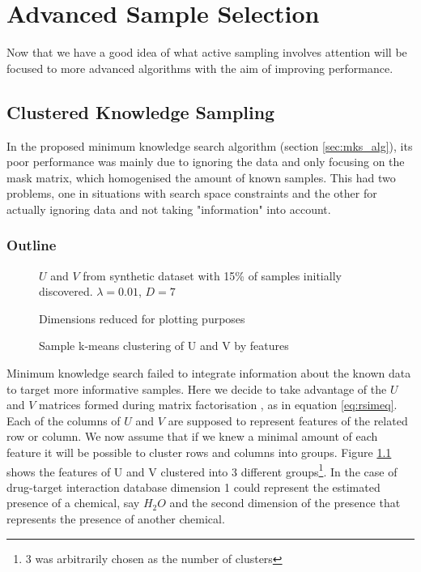 \chapter{Advanced Sample Selection}
\ifpdf
    \graphicspath{{Chapter3/Chapter3Figs/PNG/}{Chapter3/Chapter3Figs/PDF/}{Chapter3/Chapter3Figs/}}
\else
    \graphicspath{{Chapter3/Chapter3Figs/EPS/}{Chapter3/Chapter3Figs/}}
\fi


Now that we have a good idea of what active sampling involves attention will be focused to more advanced algorithms with the aim of improving performance.
\section{Clustered Knowledge Sampling}
\label{sec:cks}
In the proposed minimum knowledge search algorithm (section \ref{sec:mks_alg}), its poor performance was mainly due to ignoring the data and only focusing on the mask matrix, which homogenised the amount of known samples. This had two problems, one in situations with search space constraints and the other for actually ignoring data and not taking "information" into account.


\subsection{Outline}

\begin{figure}[!htbp]
  \begin{center}
    \resizebox{\textwidth}{!}{}
  \end{center}
    
$U$ and $V$ from synthetic dataset with 15\% of samples initially discovered.  $\lambda = 0.01$, $D=7$

Dimensions reduced for plotting purposes
    \caption{Sample k-means clustering of U and V by features}
    \label{fig:u_v_cluster}
\end{figure}

Minimum knowledge search failed to integrate information about the known data to target more informative samples. Here we decide to take advantage of the $U$ and $V$ matrices formed during matrix factorisation , as in equation \ref{eq:rsimeq}. Each of the columns of $U$ and $V$ are supposed to represent features of the related row or column. We now assume that if we knew a minimal amount of each feature it will be possible to cluster rows and columns into groups. Figure \ref{fig:u_v_cluster} shows the features of U and V clustered into 3 different groups\footnote{3 was arbitrarily chosen as the number of clusters}. In the case of drug-target interaction database dimension 1 could represent the estimated presence of a chemical, say $H_2O$ and the second dimension of the presence that represents the presence of another chemical.

